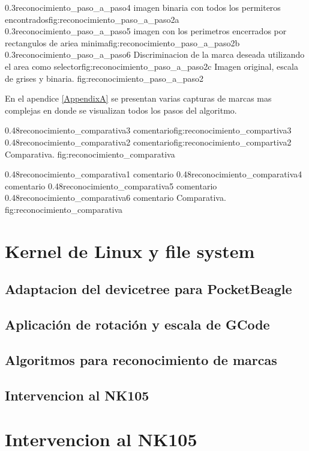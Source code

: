 \subfigabc
         {0.3}{reconocimiento_paso_a_paso4} {imagen binaria con todos los permiteros encontrados}{fig:reconocimiento_paso_a_paso2a}
         {0.3}{reconocimiento_paso_a_paso5} {imagen con los perimetros encerrados por rectangulos de ariea minima}{fig:reconocimiento_paso_a_paso2b}
         {0.3}{reconocimiento_paso_a_paso6} {Discriminacion de la marca deseada utilizando el area como selector}{fig:reconocimiento_paso_a_paso2c}
         {Imagen original, escala de grises y binaria.}
         {fig:reconocimiento_paso_a_paso2}

         En el apendice \ref{AppendixA} se presentan varias capturas de marcas mas complejas en donde se visualizan todos los pasos del algoritmo. 

\subfigab
         {0.48}{reconocimiento_comparativa3} {comentario}{fig:reconocimiento_compartiva3}
         {0.48}{reconocimiento_comparativa2} {comentario}{fig:reconocimiento_compartiva2}
         {Comparativa.}
         {fig:reconocimiento_comparativa}

\subfigtwotwo
         {0.48}{reconocimiento_comparativa1} {comentario}
         {0.48}{reconocimiento_comparativa4} {comentario}
         {0.48}{reconocimiento_comparativa5} {comentario}
         {0.48}{reconocimiento_comparativa6} {comentario}
         {Comparativa.}
         {fig:reconocimiento_comparativa}

\section{Kernel de Linux y file system}
   \subsection{Adaptacion del devicetree para PocketBeagle}
\subsection{Aplicación de rotación y escala de GCode}
\subsection{Algoritmos para reconocimiento de marcas}

\subsection{Intervencion al NK105}

\section{Intervencion al NK105}

